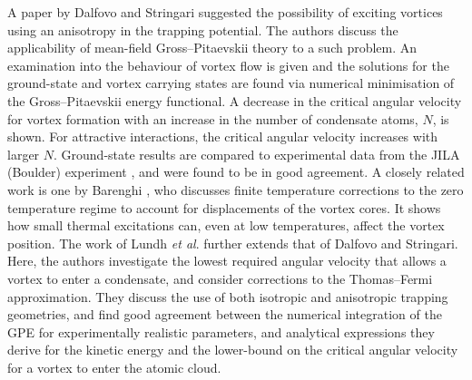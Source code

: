 A paper by Dalfovo and Stringari \cite{Vtx:Dalfovo_pra_1996} suggested the possibility of exciting vortices using an anisotropy in the
trapping potential. The authors discuss the applicability of mean-field Gross--Pitaevskii theory to a such problem. An examination into the behaviour of vortex flow is given and the solutions for the ground-state and vortex carrying states are found via numerical minimisation of the Gross--Pitaevskii energy functional. A decrease in the critical angular velocity for vortex formation with an increase in the number of condensate atoms, $N$, is shown. For attractive interactions, the critical angular velocity increases with larger $N$. Ground-state results are compared to experimental data from the JILA (Boulder) experiment \cite{BEC:Cornell_science_1995}, and were found to be in good agreement. A closely related work is one by Barenghi \cite{Vtx:Barenghi_pra_1996}, who discusses finite temperature corrections to the zero temperature regime to account for displacements of the vortex cores. It shows how small thermal excitations can, even at low temperatures, affect the vortex position. The work of Lundh \textit{et al}. \cite{Vtx:Lundh_pra_1997} further extends that of Dalfovo and Stringari. Here, the authors investigate the lowest required angular velocity that allows a vortex to enter a condensate, and consider corrections to the Thomas--Fermi approximation. They discuss the use of both isotropic and anisotropic trapping geometries, and find good agreement between the numerical integration of the GPE for experimentally realistic parameters, and analytical expressions they derive for the kinetic energy and the lower-bound on the critical angular velocity for a vortex to enter the atomic cloud.


